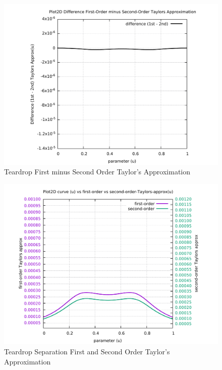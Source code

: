 \begin{figure}
	\caption     {Teardrop First minus Second Order Taylor's Approximation}
	\label{06-img-Teardrop-First-minus-Second-Order-Taylors-Approx.pdf}
	\includegraphics[width=1.00\textwidth]{Chap4/appendix/app-Teardrop/plots/06-img-Teardrop-First-minus-Second-Order-Taylors-Approx.pdf}
\end{figure}

\clearpage
\pagebreak

\begin{figure}
	\caption     {Teardrop Separation First and Second Order Taylor's Approximation}
	\label{07-img-Teardrop-Separation-First-and-Second-Order-Taylors-Approx.pdf}
\includegraphics[width=1.00\textwidth]{Chap4/appendix/app-Teardrop/plots/07-img-Teardrop-First-and-Second-Order-Taylors-Approx.pdf}
\end{figure}


